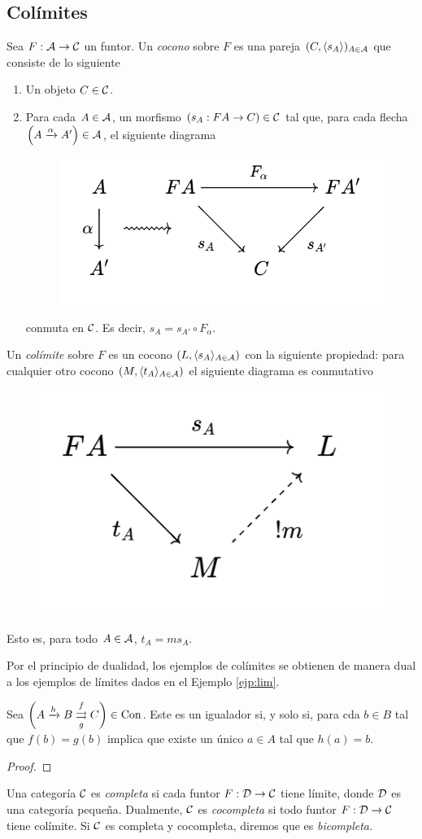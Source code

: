 \subsection{Colímites}
\begin{definition}
    Sea $F:{\mathcal A}\to{\mathcal C}$ un funtor. Un \emph{cocono} sobre $F$ es una pareja  $(C,\langle s_A\rangle)_{A\in{\mathcal A}}$ que consiste de lo siguiente 
    \begin{enumerate}
        \item Un objeto $C\in {\mathcal C}$.
        \item Para cada $A\in{\mathcal A}$, un morfismo $(s_A:FA\to C)\in{\mathcal C}$ tal que, para cada flecha $\left(A\xrightarrow{\alpha}A'\right)\in{\mathcal A}$, el siguiente diagrama 
        \begin{figure}[h!]
            \centering
            \includegraphics[width=0.4\linewidth]{img/diagrama3.png}
        \end{figure}
        conmuta en ${\mathcal C}$. Es decir, $s_A=s_{A'}\circ F_\alpha$.
    \end{enumerate}
\end{definition}
\begin{definition}
    Un \emph{colímite} sobre $F$ es un  cocono $(L,\langle s_A\rangle_{A\in{\mathcal A}})$ con la siguiente propiedad: para cualquier otro cocono $(M,\langle t_A\rangle_{A\in{\mathcal A}})$ el siguiente diagrama es conmutativo
    \begin{figure}[h!]
        \centering
        \includegraphics[width=0.3\linewidth]{img/diagrama4.png}
    \end{figure}
    Esto es, para todo $A\in {\mathcal A}$, $t_A=ms_A$.
\end{definition}
Por el principio de dualidad, los ejemplos de colímites se obtienen de manera dual a los ejemplos de límites dados en el Ejemplo \ref{ejp:lim}. 
\begin{lema}\label{lema:igualador}
    Sea $\left( A\xrightarrow{h}B \overset{f}{\underset{g}{\rightrightarrows}} C\right)\in{\mathrm{Con}}$. Este es un igualador si, y solo si, para cda $b\in B$ tal que $f(b)=g(b)$ implica que existe un único $a\in A$ tal que $h(a)=b$.
\end{lema}
\begin{proof}
\end{proof}
\begin{definition}
    Una categoría ${\mathcal C}$ es \emph{completa} si  cada funtor $F:{\mathcal D}\to{\mathcal C}$  tiene límite, donde ${\mathcal D}$ es una categoría pequeña. Dualmente, ${\mathcal C}$ es \emph{cocompleta} si todo funtor $F:{\mathcal D}\to{\mathcal C}$ tiene colímite. Si ${\mathcal C}$ es completa y cocompleta, diremos que es \emph{bicompleta.}
\end{definition}

